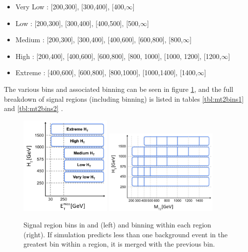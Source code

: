 \begin{itemize}
	\item Very Low \HT: [200,300], [300,400], [400,$\infty$]
	\item Low \HT: [200,300], [300,400], [400,500], [500,$\infty$]
	\item Medium \HT: [200,300], [300,400], [400,600], [600,800], [800,$\infty$]
	\item High \HT: [200,400], [400,600], [600,800], [800, 1000], [1000, 1200], [1200,$\infty$]
	\item Extreme \HT: [400,600], [600,800], [800,1000], [1000,1400], [1400,$\infty$]
\end{itemize}
The various \HT bins and associated \mttwo binning can be seen in figure \ref{fig:mt2bins}, and the full breakdown of signal regions (including \mttwo binning) is listed in tables \ref{tbl:mt2bins1} and \ref{tbl:mt2bins2} .
\begin{figure}
	\centering
	\includegraphics[width=0.4\textwidth]{analysis/figs/HTvsMET_2017}
	\includegraphics[width=0.5\textwidth]{analysis/figs/HTvsMT2bins_Moriond2017}
	\caption{Signal region bins in \HT and \MET (left) and \mttwo binning within each \HT region (right). If simulation predicts less than one background event in the greatest \mttwo bin within a region, it is merged with the previous bin.}
	\label{fig:mt2bins}
\end{figure}
